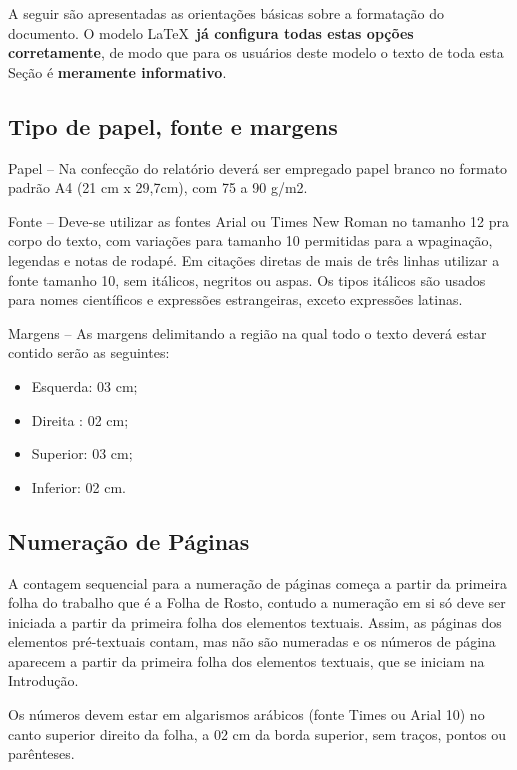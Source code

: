 A seguir são apresentadas as orientações básicas sobre a formatação do
documento. O modelo \LaTeX\ \textbf{já configura todas estas opções corretamente},
de modo que para os usuários deste modelo o texto de toda esta Seção é 
\textbf{meramente informativo}.

\subsection{Tipo de papel, fonte e margens}

Papel -- Na confecção do relatório deverá ser empregado papel branco no 
formato padrão A4 (21 cm x 29,7cm), com 75 a 90 g/m2.

Fonte -- Deve-se utilizar as fontes Arial ou Times New Roman no tamanho 12 
pra corpo do texto, com variações para tamanho 10 permitidas para a 
wpaginação, legendas e notas de rodapé. Em citações diretas de mais de três 
linhas utilizar a fonte tamanho 10, sem itálicos, negritos ou aspas. Os 
tipos itálicos são usados para nomes científicos e expressões estrangeiras, 
exceto expressões latinas.

Margens -- As margens delimitando a região na qual todo o texto deverá estar 
contido serão as seguintes: 

\begin{itemize}
	\item Esquerda: 03 cm;
	\item Direita	: 02 cm;
	\item Superior: 03 cm;
	\item Inferior: 02 cm. 
\end{itemize}

\subsection{Numeração de Páginas}

A contagem sequencial para a numeração de páginas começa a partir da 
primeira folha do trabalho que é a Folha de Rosto, contudo a numeração em 
si só deve ser iniciada a partir da primeira folha dos elementos textuais. 
Assim, as páginas dos elementos pré-textuais contam, mas não são numeradas 
e os números de página aparecem a partir da primeira folha dos elementos 
textuais, que se iniciam na Introdução. 

Os números devem estar em algarismos arábicos (fonte Times ou Arial 10) no 
canto superior direito da folha, a 02 cm da borda superior, sem traços, 
pontos ou parênteses. 

